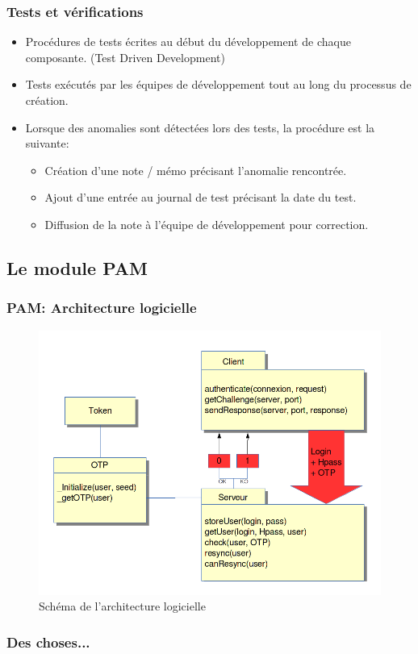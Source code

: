 \documentclass[xcolor=table]{beamer}
\begin{document}
\begin{frame}
  \frametitle{Tests et vérifications}
  \begin{itemize}
   \item Procédures de tests écrites au début du développement de chaque composante. (Test Driven Development)
   \item Tests exécutés par les équipes de développement tout au long du processus de création.
   \item  Lorsque des anomalies sont détectées lors des tests, la procédure est la suivante:
    \begin{itemize}
     \item Création d'une note / mémo précisant l'anomalie rencontrée.
     \item Ajout d'une entrée au journal de test précisant la date du test.
     \item Diffusion de la note à l'équipe de développement pour correction.
    \end{itemize}
  \end{itemize}
\end{frame}




\subsection{Le module PAM}
\begin{frame}
\frametitle{PAM: Architecture logicielle}
\begin{figure}
 \includegraphics[scale=0.3]{../graphics/architecture.png} 
 \caption{Schéma de l'architecture logicielle}
\end{figure}

\end{frame}
\begin{frame}
\frametitle{Des choses...}
\end{frame}
\end{document}
